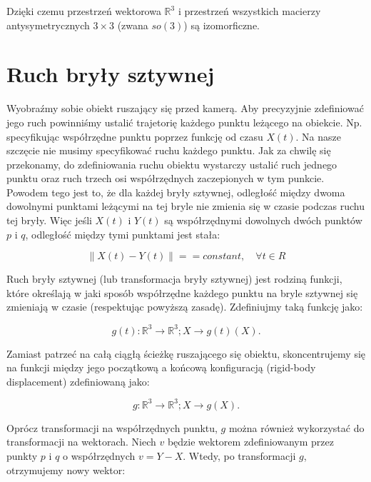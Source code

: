\documentclass[a4paper,12pt]{article}
\newcommand{\RR}{\mathbb{R}^3}
\begin{document}
Dzięki czemu przestrzeń wektorowa $\RR$ i przestrzeń wszystkich macierzy antysymetrycznych $3 \times 3$ (zwana $so(3)$) są izomorficzne.

\section{Ruch bryły sztywnej}

\indent \indent Wyobraźmy sobie obiekt ruszający się przed kamerą. Aby precyzyjnie zdefiniować jego ruch powinniśmy ustalić trajetorię każdego punktu leżącego na obiekcie. Np. specyfikując współrzędne punktu poprzez funkcję od czasu $X(t)$. Na nasze szczęcie nie musimy specyfikować ruchu każdego punktu. Jak za chwilę się przekonamy, do zdefiniowania ruchu obiektu wystarczy ustalić ruch jednego punktu oraz ruch trzech osi współrzędnych zaczepionych w tym punkcie. Powodem tego jest to, że dla każdej bryły sztywnej, odległość między dwoma dowolnymi punktami leżącymi na tej bryle nie zmienia się w czasie podczas ruchu tej bryły. Więc jeśli $X(t)$ i $Y(t)$ są współrzędnymi dowolnych dwóch punktów $p$ i $q$, odległość między tymi punktami jest stała:

\begin{equation}
\| X(t) - Y(t) \| == constant, \quad \forall t \in R
\end{equation}

Ruch bryły sztywnej (lub transformacja bryły sztywnej) jest rodziną funkcji, które określają w jaki sposób współrzędne każdego punktu na bryle sztywnej się zmieniają w czasie (respektując powyższą zasadę). Zdefiniujmy taką funkcję jako:

\begin{equation}
g(t): \RR \rightarrow \RR; X \rightarrow g(t)(X).
\end{equation}

Zamiast patrzeć na całą ciągłą ścieżkę ruszającego się obiektu, skoncentrujemy się na funkcji między jego początkową a końcową konfiguracją (rigid-body displacement) zdefiniowaną jako:

\begin{equation}
g: \RR \rightarrow \RR; X \rightarrow g(X).
\end{equation}

Oprócz transformacji na współrzędnych punktu, $g$ można również wykorzystać do transformacji na wektorach. Niech $v$ będzie wektorem zdefiniowanym przez punkty $p$ i $q$ o współrzędnych $v = Y - X$. Wtedy, po transformacji $g$, otrzymujemy nowy wektor:
\end{document}
